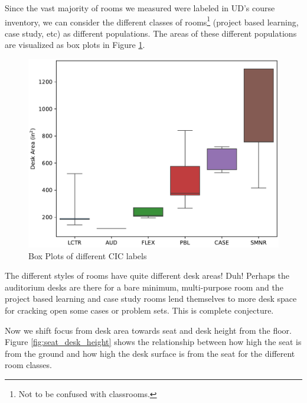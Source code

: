\documentclass[conference]{IEEEtran}
\begin{document}
Since the vast majority of  rooms we measured were labeled in UD's course inventory, we can consider the different classes of rooms\footnote{Not to be confused with classrooms.} (project based learning, case study, etc) as different populations. The areas of these different populations are visualized as box plots in Figure \ref*{fig:boxplots}.

\begin{figure}[H]
    \includegraphics[width=\linewidth]{vis/boxplots.pdf}
    \caption{Box Plots of different CIC labels}
    \label{fig:boxplots}
\end{figure}

The different styles of rooms have quite different desk areas! Duh! Perhaps the auditorium desks are there for a bare minimum, multi-purpose room and the project based learning and case study rooms lend themselves to more desk space for cracking open some cases or problem sets. This is complete conjecture.

Now we shift focus from desk area towards seat and desk height from the floor. Figure \ref*{fig:seat_desk_height} shows the relationship between how high the seat is from the ground and how high the desk surface is from the seat for the different room classes.
\end{document}
